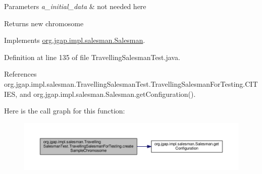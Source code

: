 \begin{DoxyParams}{Parameters}
{\em a\-\_\-initial\-\_\-data} & not needed here \\
\hline
\end{DoxyParams}
\begin{DoxyReturn}{Returns}
new chromosome 
\end{DoxyReturn}


Implements \hyperlink{classorg_1_1jgap_1_1impl_1_1salesman_1_1_salesman_a862317900d8463de5375560a20b2df34}{org.\-jgap.\-impl.\-salesman.\-Salesman}.



Definition at line 135 of file Travelling\-Salesman\-Test.\-java.



References org.\-jgap.\-impl.\-salesman.\-Travelling\-Salesman\-Test.\-Travelling\-Salesman\-For\-Testing.\-C\-I\-T\-I\-E\-S, and org.\-jgap.\-impl.\-salesman.\-Salesman.\-get\-Configuration().



Here is the call graph for this function\-:
\nopagebreak
\begin{figure}[H]
\begin{center}
\leavevmode
\includegraphics[width=350pt]{classorg_1_1jgap_1_1impl_1_1salesman_1_1_travelling_salesman_test_1_1_travelling_salesman_for_testing_a3587ad164718c422dba17cc9c1a2507f_cgraph}
\end{center}
\end{figure}


